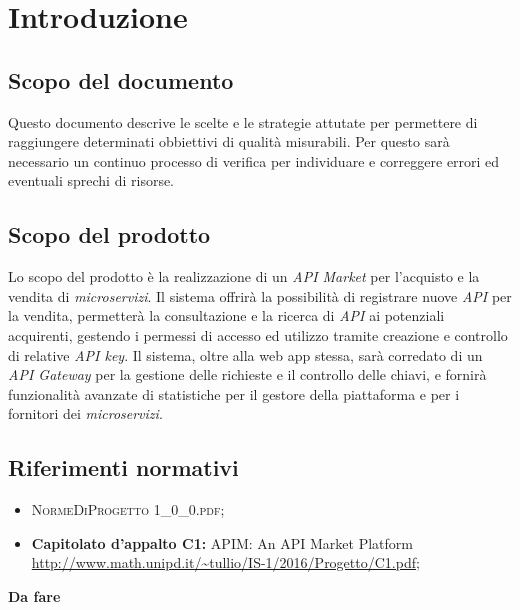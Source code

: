 \newpage
\section{Introduzione}

\subsection{Scopo del documento}
Questo documento descrive le scelte e le strategie attutate per permettere di raggiungere determinati obbiettivi di qualità misurabili. Per questo sarà necessario un continuo processo di verifica per individuare e correggere errori ed eventuali sprechi di risorse.

\subsection{Scopo del prodotto}
Lo scopo del prodotto è la realizzazione di un \textit{API Market} per l'acquisto e la vendita di \textit{microservizi}. Il sistema offrirà la possibilità di registrare nuove \textit{API} per la vendita, permetterà la consultazione e la ricerca di \textit{API} ai potenziali acquirenti, gestendo i permessi di accesso ed utilizzo tramite creazione e controllo di relative \textit{API key}. Il sistema, oltre alla web app stessa, sarà corredato di un \textit{API Gateway} per la gestione delle richieste e il controllo delle chiavi, e fornirà funzionalità avanzate di statistiche per il gestore della piattaforma e per i fornitori dei \textit{microservizi}.

\subsection{Riferimenti normativi}
\begin{itemize}
\item \textsc{NormeDiProgetto 1\_0\_0.pdf};
\item \textbf{Capitolato d’appalto C1:} APIM: An API Market Platform\\ \url{http://www.math.unipd.it/~tullio/IS-1/2016/Progetto/C1.pdf};
\end{itemize}
\textbf{Da fare}

